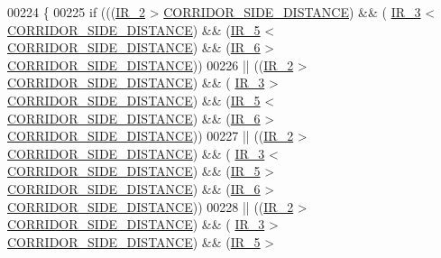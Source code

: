\begin{DoxyCode}
00224         \{
00225             \textcolor{keywordflow}{if} (((\hyperlink{state__machine_8c_a07cfb2e201909d017a88a2a86c32cd4b}{IR\_2} > \hyperlink{state__machine_8c_a201d56046ddf552d57b4862e0ec07a10}{CORRIDOR\_SIDE\_DISTANCE}) && (
      \hyperlink{state__machine_8c_a7831b71dc250258ecefe0e23f9920688}{IR\_3} < \hyperlink{state__machine_8c_a201d56046ddf552d57b4862e0ec07a10}{CORRIDOR\_SIDE\_DISTANCE}) && (\hyperlink{state__machine_8c_ad00ba6cc1cf461bda7059f5aafc06142}{IR\_5} < 
      \hyperlink{state__machine_8c_a201d56046ddf552d57b4862e0ec07a10}{CORRIDOR\_SIDE\_DISTANCE}) && (\hyperlink{state__machine_8c_a8c51bcd8b555e8c78fea79b88d28b55e}{IR\_6} > 
      \hyperlink{state__machine_8c_a201d56046ddf552d57b4862e0ec07a10}{CORRIDOR\_SIDE\_DISTANCE}))
00226              || ((\hyperlink{state__machine_8c_a07cfb2e201909d017a88a2a86c32cd4b}{IR\_2} > \hyperlink{state__machine_8c_a201d56046ddf552d57b4862e0ec07a10}{CORRIDOR\_SIDE\_DISTANCE}) && (
      \hyperlink{state__machine_8c_a7831b71dc250258ecefe0e23f9920688}{IR\_3} > \hyperlink{state__machine_8c_a201d56046ddf552d57b4862e0ec07a10}{CORRIDOR\_SIDE\_DISTANCE}) && (\hyperlink{state__machine_8c_ad00ba6cc1cf461bda7059f5aafc06142}{IR\_5} < 
      \hyperlink{state__machine_8c_a201d56046ddf552d57b4862e0ec07a10}{CORRIDOR\_SIDE\_DISTANCE}) && (\hyperlink{state__machine_8c_a8c51bcd8b555e8c78fea79b88d28b55e}{IR\_6} > 
      \hyperlink{state__machine_8c_a201d56046ddf552d57b4862e0ec07a10}{CORRIDOR\_SIDE\_DISTANCE}))
00227              || ((\hyperlink{state__machine_8c_a07cfb2e201909d017a88a2a86c32cd4b}{IR\_2} > \hyperlink{state__machine_8c_a201d56046ddf552d57b4862e0ec07a10}{CORRIDOR\_SIDE\_DISTANCE}) && (
      \hyperlink{state__machine_8c_a7831b71dc250258ecefe0e23f9920688}{IR\_3} < \hyperlink{state__machine_8c_a201d56046ddf552d57b4862e0ec07a10}{CORRIDOR\_SIDE\_DISTANCE}) && (\hyperlink{state__machine_8c_ad00ba6cc1cf461bda7059f5aafc06142}{IR\_5} > 
      \hyperlink{state__machine_8c_a201d56046ddf552d57b4862e0ec07a10}{CORRIDOR\_SIDE\_DISTANCE}) && (\hyperlink{state__machine_8c_a8c51bcd8b555e8c78fea79b88d28b55e}{IR\_6} > 
      \hyperlink{state__machine_8c_a201d56046ddf552d57b4862e0ec07a10}{CORRIDOR\_SIDE\_DISTANCE}))
00228              || ((\hyperlink{state__machine_8c_a07cfb2e201909d017a88a2a86c32cd4b}{IR\_2} > \hyperlink{state__machine_8c_a201d56046ddf552d57b4862e0ec07a10}{CORRIDOR\_SIDE\_DISTANCE}) && (
      \hyperlink{state__machine_8c_a7831b71dc250258ecefe0e23f9920688}{IR\_3} > \hyperlink{state__machine_8c_a201d56046ddf552d57b4862e0ec07a10}{CORRIDOR\_SIDE\_DISTANCE}) && (\hyperlink{state__machine_8c_ad00ba6cc1cf461bda7059f5aafc06142}{IR\_5} > 

\end{DoxyCode}
